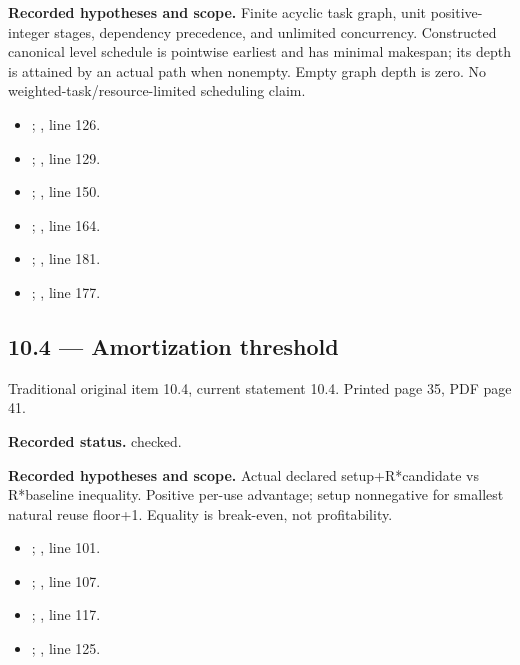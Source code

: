 \textbf{Recorded hypotheses and scope.} Finite acyclic task graph, unit positive-integer stages, dependency precedence, and unlimited concurrency. Constructed canonical level schedule is pointwise earliest and has minimal makespan; its depth is attained by an actual path when nonempty. Empty graph depth is zero. No weighted-task/resource-limited scheduling claim.

\begin{itemize}
\item {}; , line 126.
\item {}; , line 129.
\item {}; , line 150.
\item {}; , line 164.
\item {}; , line 181.
\item {}; , line 177.
\end{itemize}
\subsection{10.4 — Amortization threshold}
\label{result:10.4}
{\footnotesize\color{muted}Traditional original item 10.4, current statement 10.4. Printed page 35, PDF page 41.}\par
\textbf{Recorded status.} checked.

\textbf{Recorded hypotheses and scope.} Actual declared setup+R*candidate vs R*baseline inequality. Positive per-use advantage; setup nonnegative for smallest natural reuse floor+1. Equality is break-even, not profitability.

\begin{itemize}
\item {}; , line 101.
\item {}; , line 107.
\item {}; , line 117.
\item {}; , line 125.
\end{itemize}

